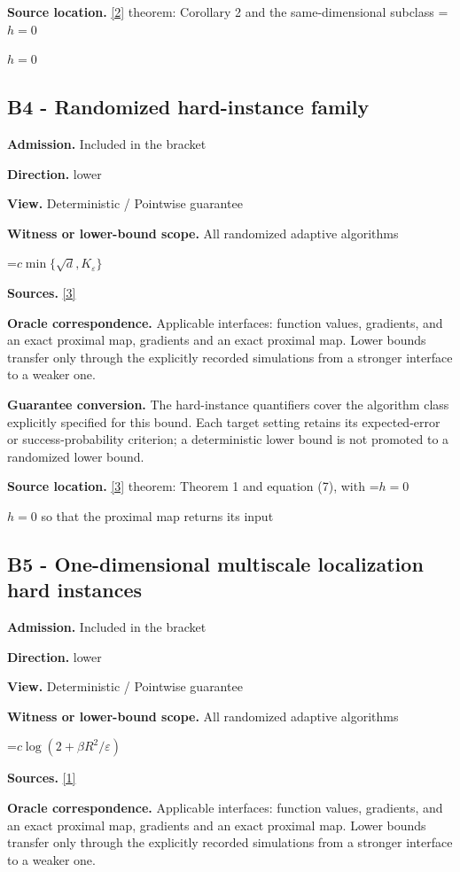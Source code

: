 \documentclass[10pt,a4paper]{article}
\newcommand{\AtlasMath}[1]{\par\begingroup\centering\setbox0=\hbox{$\displaystyle #1$}\ifdim\wd0>1.4\linewidth\typeout{ATLAS WIDE FORMULA: \the\wd0}\fi\ifdim\wd0>\linewidth\resizebox{\linewidth}{!}{\box0}\else\box0\fi\par\endgroup}
\newcommand{\AtlasInlineMath}[1]{\begingroup\setbox0=\hbox{$#1$}\ifdim\wd0>.4\linewidth\endgroup\AtlasMath{#1}\else\endgroup$#1$\fi}
\begin{document}
\textbf{Source location.} \href{https://arxiv.org/pdf/2101.09740v2}{[2]} theorem: Corollary 2 and the same-dimensional subclass \AtlasInlineMath{h=0}

\subsection{B4 - Randomized hard-instance family}
\textbf{Admission.} Included in the bracket

\textbf{Direction.} lower

\textbf{View.} Deterministic / Pointwise guarantee

\textbf{Witness or lower-bound scope.} All randomized adaptive algorithms

\AtlasMath{c\min\{\sqrt d,K_\varepsilon\}}
\textbf{Sources.} \href{https://arxiv.org/pdf/2609.10874}{[3]}

\textbf{Oracle correspondence.} Applicable interfaces: function values, gradients, and an exact proximal map, gradients and an exact proximal map. Lower bounds transfer only through the explicitly recorded simulations from a stronger interface to a weaker one.

\textbf{Guarantee conversion.} The hard-instance quantifiers cover the algorithm class explicitly specified for this bound. Each target setting retains its expected-error or success-probability criterion; a deterministic lower bound is not promoted to a randomized lower bound.

\textbf{Source location.} \href{https://arxiv.org/pdf/2609.10874}{[3]} theorem: Theorem 1 and equation (7), with \AtlasInlineMath{h=0} so that the proximal map returns its input

\subsection{B5 - One-dimensional multiscale localization hard instances}
\textbf{Admission.} Included in the bracket

\textbf{Direction.} lower

\textbf{View.} Deterministic / Pointwise guarantee

\textbf{Witness or lower-bound scope.} All randomized adaptive algorithms

\AtlasMath{c\log(2+\beta R^2/\varepsilon)}
\textbf{Sources.} \href{https://www.tau.ac.il/~becka/FISTA.pdf}{[1]}

\textbf{Oracle correspondence.} Applicable interfaces: function values, gradients, and an exact proximal map, gradients and an exact proximal map. Lower bounds transfer only through the explicitly recorded simulations from a stronger interface to a weaker one.
\end{document}
